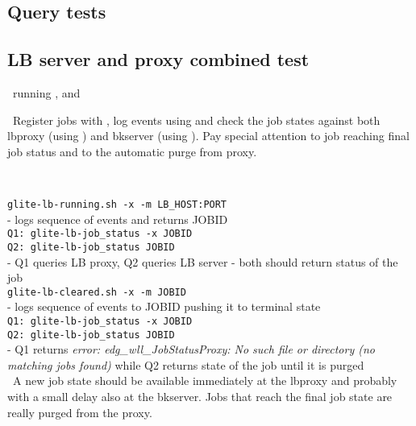 \subsection{Query tests}


\subsection{LB server and proxy combined test}

\req\ running ,  and

\what\ Register jobs with , log events
using  and check the job states against
both lbproxy (using ) and bkserver
(using ). Pay special attention to job reaching final 
job status and to the automatic purge from proxy.


\how\ 

{\tt glite-lb-running.sh -x -m LB\_HOST:PORT} \\
- logs sequence of events and returns JOBID \\

{\tt Q1: glite-lb-job\_status -x JOBID } \\
{\tt Q2: glite-lb-job\_status JOBID } \\
- Q1 queries LB proxy, Q2 queries LB server - both should return status of the job \\

{\tt glite-lb-cleared.sh -x -m JOBID} \\
- logs sequence of events to JOBID pushing it to terminal state \\

{\tt Q1: glite-lb-job\_status -x JOBID } \\
{\tt Q2: glite-lb-job\_status JOBID } \\
- Q1 returns {\em error: edg\_wll\_JobStatusProxy: No such file or directory (no matching jobs found)} while Q2 returns state of the job until it is purged \\

\result\ A new job state should be available immediately at the
lbproxy and probably with a small delay also at the bkserver. Jobs that reach the final job state
are really purged from the proxy.



